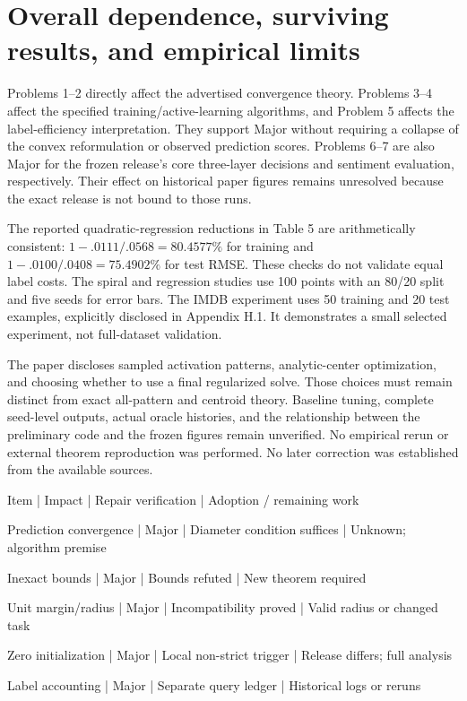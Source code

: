 \documentclass[10pt]{article}
\begin{document}
\section*{Overall dependence, surviving results, and empirical limits}
Problems 1–2 directly affect the advertised convergence theory. Problems 3–4 affect the specified training/active-learning algorithms, and Problem 5 affects the label-efficiency interpretation. They support Major without requiring a collapse of the convex reformulation or observed prediction scores. Problems 6–7 are also Major for the frozen release’s core three-layer decisions and sentiment evaluation, respectively. Their effect on historical paper figures remains unresolved because the exact release is not bound to those runs.\par
The reported quadratic-regression reductions in Table 5 are arithmetically consistent: \(1-.0111/.0568=80.4577\%\) for training and \(1-.0100/.0408=75.4902\%\) for test RMSE. These checks do not validate equal label costs. The spiral and regression studies use 100 points with an 80/20 split and five seeds for error bars. The IMDB experiment uses 50 training and 20 test examples, explicitly disclosed in Appendix H.1. It demonstrates a small selected experiment, not full-dataset validation.\par
The paper discloses sampled activation patterns, analytic-center optimization, and choosing whether to use a final regularized solve. Those choices must remain distinct from exact all-pattern and centroid theory. Baseline tuning, complete seed-level outputs, actual oracle histories, and the relationship between the preliminary code and the frozen figures remain unverified. No empirical rerun or external theorem reproduction was performed. No later correction was established from the available sources.\par
Item | Impact | Repair verification | Adoption / remaining work\par
Prediction convergence | Major | Diameter condition suffices | Unknown; algorithm premise\par
Inexact bounds | Major | Bounds refuted | New theorem required\par
Unit margin/radius | Major | Incompatibility proved | Valid radius or changed task\par
Zero initialization | Major | Local non-strict trigger | Release differs; full analysis\par
Label accounting | Major | Separate query ledger | Historical logs or reruns\par
\end{document}
